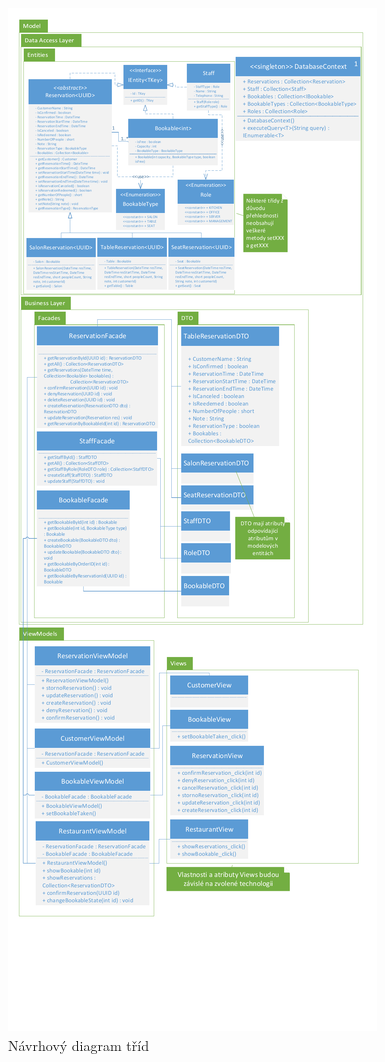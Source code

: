 \newpage
\begin{figure}[h!]
\begin{center}
\includegraphics[scale=0.5]{../02_Vysledne_modely/07_1_ClassDiagram.pdf}
\vspace{150pt}
\caption{Návrhový diagram tříd}
\label{fig:communication09-1}
\end{center}
\end{figure}